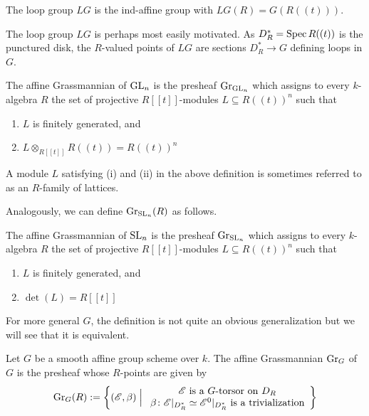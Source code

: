 \documentclass[12pt]{article}
\begin{document}
\begin{defn}
    The loop group $LG$ is the ind-affine group with $LG(R) = G(R((t)))$.
\end{defn}

The loop group $LG$ is perhaps most easily motivated. As $D^*_R = \operatorname{Spec} R((t))$ is the punctured disk, the $R$-valued points of $LG$ are sections $D^*_R \to G$ defining loops in $G$. 

\begin{defn}
    The affine Grassmannian of $\operatorname{GL}_n$ is the presheaf $\operatorname{Gr}_{\operatorname{GL}_n}$ which assigns to every $k$-algebra $R$ the set of projective $R[[t]]$-modules $L \subseteq R((t))^n$ such that
    \begin{enumerate}
        \item $L$ is finitely generated, and
        \item $L \otimes_{R[[t]]} R((t)) = R((t))^n$
    \end{enumerate}
\end{defn}

A module $L$ satisfying (i) and (ii) in the above definition is sometimes referred to as an $R$-family of lattices.

Analogously, we can define $\operatorname{Gr}_{\operatorname{SL}_n}(R)$ as follows.

\begin{defn}\label{GrSLn}
    The affine Grassmannian of $\operatorname{SL}_n$ is the presheaf $\operatorname{Gr}_{\operatorname{SL}_n}$ which assigns to every $k$-algebra $R$ the set of projective $R[[t]]$-modules $L \subseteq R((t))^n$ such that
    \begin{enumerate}
        \item $L$ is finitely generated, and
        \item $\det(L) = R[[t]]$
    \end{enumerate}
\end{defn}

For more general $G$, the definition is not quite an obvious generalization but we will see that it is equivalent.

\begin{defn}
    Let $G$ be a smooth affine group scheme over $k$. The affine Grassmannian $\operatorname{Gr}_G$ of $G$ is the presheaf whose $R$-points are given by
    \[\operatorname{Gr}_G(R) := \left\{(\mathscr{E},\beta) \;\Big\vert\; \begin{array}{c}
    \mathscr{E} \text{ is a } G \text{-torsor on } D_R \\ 
    \beta \colon \mathscr{E}\vert_{D_R^*} \simeq \mathscr{E}^0\vert_{D_R^*} \text{ is a trivialization} 
    \end{array} \right\}\]
\end{defn}
\end{document}
